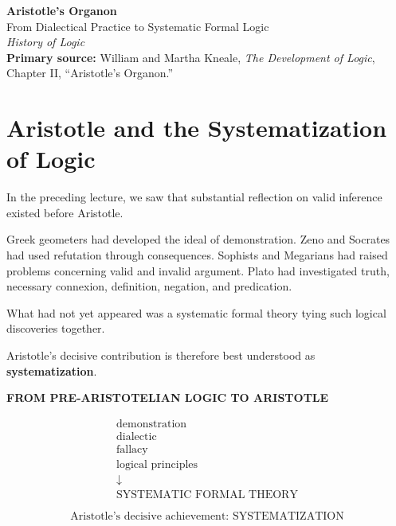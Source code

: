 \documentclass[11pt]{article}
\begin{document}
\begin{center}
    {\LARGE \textbf{Aristotle's Organon}}\\[0.4em]
    {\large From Dialectical Practice to Systematic Formal Logic}\\[0.8em]
    \textit{History of Logic}\\[0.5em]
    \textbf{Primary source:} William and Martha Kneale,
    \textit{The Development of Logic}, Chapter II,
    ``Aristotle's Organon.''
\end{center}

\vspace{1em}


\section{Aristotle and the Systematization of Logic}

In the preceding lecture, we saw that substantial reflection on
valid inference existed before Aristotle.

Greek geometers had developed the ideal of demonstration.
Zeno and Socrates had used refutation through consequences.
Sophists and Megarians had raised problems concerning valid and
invalid argument.
Plato had investigated truth, necessary connexion, definition,
negation, and predication.

What had not yet appeared was a systematic formal theory tying
such logical discoveries together.

Aristotle's decisive contribution is therefore best understood as
\textbf{systematization}.

\begin{whiteboard}
\textbf{FROM PRE-ARISTOTELIAN LOGIC TO ARISTOTLE}

\[
\begin{array}{c}
\text{demonstration}\\
\text{dialectic}\\
\text{fallacy}\\
\text{logical principles}\\
\downarrow\\
\boxed{\text{SYSTEMATIC FORMAL THEORY}}
\end{array}
\]

\[
\boxed{\text{Aristotle's decisive achievement: SYSTEMATIZATION}}
\]
\end{whiteboard}
\end{document}
